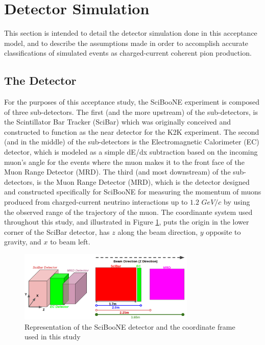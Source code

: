 \documentclass[11pt]{article}
\begin{document}
\section{Detector Simulation}
\label{sec:simulation}
This section is intended to detail the detector simulation done in this acceptance model, and to describe the assumptions made in order to accomplish accurate classifications of simulated events as charged-current coherent pion production.

\subsection{The Detector}
\label{sub:detector}
For the purposes of this acceptance study, the SciBooNE experiment is composed of three sub-detectors. The first (and the more upstream) of the sub-detectors, is the Scintillator Bar Tracker (SciBar) which was originally conceived and constructed to function as the near detector for the K2K experiment. The second (and in the middle) of the sub-detectors is the Electromagnetic Calorimeter (EC) detector, which is modeled as a simple dE/dx subtraction based on the incoming muon's angle for the events where the muon makes it to the front face of the Muon Range Detector (MRD). The third (and most downstream) of the sub-detectors, is the Muon Range Detector (MRD), which is the detector designed and constructed specifically for SciBooNE for measuring the momentum of muons produced from charged-current neutrino interactions up to $1.2$ $GeV/c$ by using the observed range of the trajectory of the muon. The coordinante system used throughout this study, and illustrated in  Figure \ref*{fig:SciBooNEDetector}, puts the origin in the lower corner of the SciBar detector, has $z$ along the beam direction, $y$ opposite to gravity, and $x$ to beam left. 

\begin{figure}[H]
\centering
\includegraphics[width=0.75\textwidth]{EventClassifications/SciBooNEDetector.png}
\caption{Representation of the SciBooNE detector and the coordinate frame used in this study}
\label{fig:SciBooNEDetector}
\end{figure}
\end{document}
